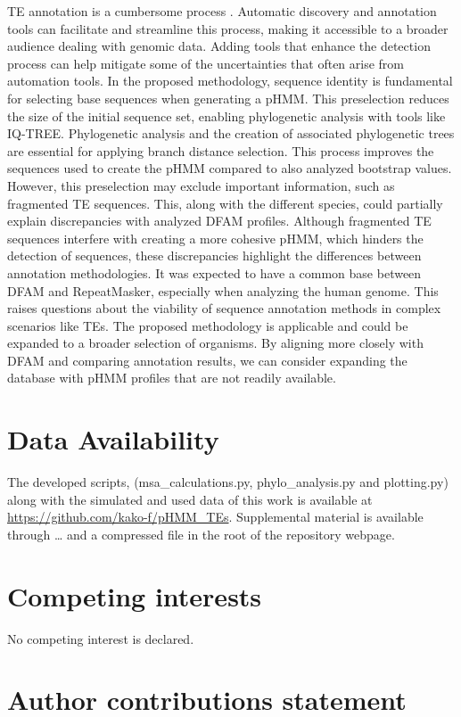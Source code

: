 \documentclass[unnumsec,webpdf,contemporary,large]{oup-authoring-template}%
\theoremstyle{thmstyleone}%
\theoremstyle{thmstyletwo}%
\theoremstyle{thmstylethree}%
\begin{document}
TE annotation is a cumbersome process \cite{ou_benchmarking_2019, branco_overview_2023}. Automatic discovery and annotation tools can facilitate and streamline this process, making it accessible to a broader audience dealing with genomic data. Adding tools that enhance the detection process can help mitigate some of the uncertainties that often arise from automation tools. In the proposed methodology, sequence identity is fundamental for selecting base sequences when generating a pHMM. This preselection reduces the size of the initial sequence set, enabling phylogenetic analysis with tools like IQ-TREE. Phylogenetic analysis and the creation of associated phylogenetic trees are essential for applying branch distance selection. This process improves the sequences used to create the pHMM compared to also analyzed bootstrap values. However, this preselection may exclude important information, such as fragmented TE sequences. This, along with the different species, could partially explain discrepancies with analyzed DFAM profiles. Although fragmented TE sequences interfere with creating a more cohesive pHMM, which hinders the detection of sequences, these discrepancies highlight the differences between annotation methodologies. It was expected to have a common base between DFAM and RepeatMasker, especially when analyzing the human genome. This raises questions about the viability of sequence annotation methods in complex scenarios like TEs. The proposed methodology is applicable and could be expanded to a broader selection of organisms. By aligning more closely with DFAM and comparing annotation results, we can consider expanding the database with pHMM profiles that are not readily available.

\section{Data Availability}
The developed scripts, (msa\_calculations.py, phylo\_analysis.py and plotting.py) along with the simulated and used data of this work is available at \url{https://github.com/kako-f/pHMM_TEs}. Supplemental material is available through … and a compressed file in the root of the repository webpage.

\section{Competing interests}
No competing interest is declared.

\section{Author contributions statement}
\end{document}
